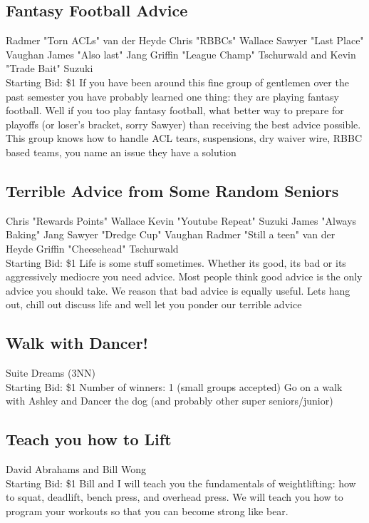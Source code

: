 \documentclass[11pt]{article}
\begin{document}
\subsection{Fantasy Football Advice}
Radmer "Torn ACLs" van der Heyde Chris "RBBCs" Wallace Sawyer "Last Place" Vaughan James "Also last" Jang Griffin "League Champ" Tschurwald and Kevin "Trade Bait" Suzuki
\\
Starting Bid: \$1
\newline
If you have been around this fine group of gentlemen over the past semester you have probably learned one thing: they are playing fantasy football. Well if you too play fantasy football, what better way to prepare for playoffs (or loser's bracket, sorry Sawyer) than receiving the best advice possible. This group knows how to handle ACL tears, suspensions, dry waiver wire, RBBC based teams, you name an issue they have a solution
\subsection{Terrible Advice from Some Random Seniors}
Chris "Rewards Points" Wallace Kevin "Youtube Repeat" Suzuki James "Always Baking" Jang Sawyer "Dredge Cup" Vaughan Radmer "Still a teen" van der Heyde Griffin "Cheesehead" Tschurwald
\\
Starting Bid: \$1
\newline
Life is some stuff sometimes. Whether its good, its bad or its aggressively mediocre you need advice. Most people think good advice is the only advice you should take. We reason that bad advice is equally useful. Lets hang out, chill out discuss life and well let you ponder our terrible advice
\subsection{Walk with Dancer!}
Suite Dreams (3NN)
\\
Starting Bid: \$1
\newline
Number of winners: 1 (small groups accepted)
\newline
Go on a walk with Ashley and Dancer the dog (and probably other super seniors/junior)
\subsection{Teach you how to Lift}
David Abrahams and Bill Wong
\\
Starting Bid: \$1
\newline
Bill and I will teach you the fundamentals of weightlifting: how to squat, deadlift, bench press, and overhead press. We will teach you how to program your workouts so that you can become strong like bear.
\end{document}
